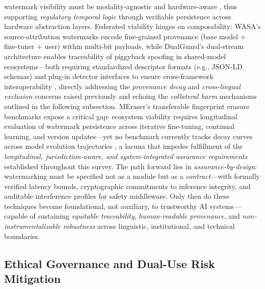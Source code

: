 \documentclass[11pt,a4paper]{article}
\begin{document}
watermark visibility must be modality-agnostic and hardware-aware \cite{doi:10.1109/icassp48485.2024.10447264,arxiv:1910.12366}, thus supporting \emph{regulatory temporal logic} through verifiable persistence across hardware abstraction layers. Federated viability hinges on composability: WASA's source-attribution watermarks encode fine-grained provenance (base model + fine-tuner + user) within multi-bit payloads, while DualGuard's dual-stream architecture enables traceability of piggyback spoofing in shared-model ecosystems---both requiring standardized descriptor formats (e.g., JSON-LD schemas) and plug-in detector interfaces to ensure cross-framework interoperability \cite{arxiv:2403.04808,arxiv:2506.00359}, directly addressing the \emph{provenance decay} and \emph{cross-lingual exclusion} concerns raised previously and echoing the \emph{collateral harm} mechanisms outlined in the following subsection. MEraser's transferable fingerprint erasure benchmarks expose a critical gap: ecosystem viability requires longitudinal evaluation of watermark persistence across iterative fine-tuning, continual learning, and version updates---yet no benchmark currently tracks decay curves across model evolution trajectories \cite{arxiv:2402.19361,arxiv:2406.03728}, a lacuna that impedes fulfillment of the \emph{longitudinal, jurisdiction-aware, and system-integrated assurance requirements} established throughout this survey. The path forward lies in \emph{assurance-by-design}: watermarking must be specified not as a module but as a \emph{contract}---with formally verified latency bounds, cryptographic commitments to inference integrity, and auditable interference profiles for safety middleware. Only then do these techniques become foundational, not auxiliary, to trustworthy AI systems---capable of sustaining \emph{equitable traceability}, \emph{human-readable provenance}, and \emph{non-instrumentalizable robustness} across linguistic, institutional, and technical boundaries.


\subsection{Ethical Governance and Dual-Use Risk Mitigation}
\end{document}
